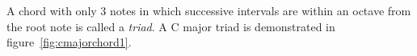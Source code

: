 A chord with only 3 notes in which successive intervals are within an octave from the root note is called a \textit{triad}. A C major triad is demonstrated in figure~\ref{fig:cmajorchord1}.



